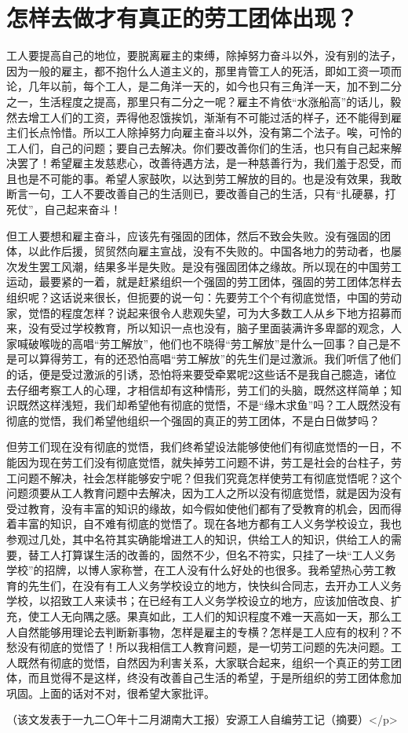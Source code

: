 \section{怎样去做才有真正的劳工团体出现？ }


工人要提高自己的地位，要脱离雇主的束缚，除掉努力奋斗以外，没有别的法子，因为一般的雇主，都不抱什么人道主义的，那里肯管工人的死活，即如工资一项而论，几年以前，每个工人，是二角洋一天的，如今也只有三角洋一天，加不到二分之一，生活程度之提高，那里只有二分之一呢？雇主不肯依“水涨船高”的话儿，毅然去增工人们的工资，弄得他忍饿挨饥，渐渐有不可能过活的样子，还不能得到雇主们长点怜惜。所以工人除掉努力向雇主奋斗以外，没有第二个法子。唉，可怜的工人们，自己的问题；要自己去解决。你们要改善你们的生活，也只有自己起来解决罢了！希望雇主发慈悲心，改善待遇方法，是一种慈善行为，我们羞于忍受，而且也是不可能的事。希望人家鼓吹，以达到劳工解放的目的。也是没有效果，我敢断言一句，工人不要改善自己的生活则已，要改善自己的生活，只有“扎硬暴，打死仗”，自己起来奋斗！

但工人要想和雇主奋斗，应该先有强固的团体，然后不致会失败。没有强固的团体，以此作后援，贸贸然向雇主宣战，没有不失败的。中国各地力的劳动者，也屡次发生罢工风潮，结果多半是失败。是没有强固团体之缘故。所以现在的中国劳工运动，最要紧的一着，就是赶紧组织一个强固的劳工团体，强固的劳工团体怎样去组织呢？这话说来很长，但扼要的说一句：先要劳工个个有彻底觉悟，中国的劳动家，觉悟的程度怎样？说起来很令人悲观失望，可为大多数工人从乡下地方招募而来，没有受过学校教育，所以知识一点也没有，脑子里面装满许多卑鄙的观念，人家喊破喉咙的高唱“劳工解放”，他们也不晓得“劳工解放”是什么一回事？自己是不是可以算得劳工，有的还恐怕高唱“劳工解放”的先生们是过激派。我们听信了他们的话，便是受过激派的引诱，恐怕将来要受牵累呢2这些话不是我自己臆造，诸位去仔细考察工人的心理，才相信却有这种情形，劳工们的头脑，既然这样简单；知识既然这样浅短，我们却希望他有彻底的觉悟，不是“缘木求鱼”吗？工人既然没有彻底的觉悟，我们希望他组织一个强固的真正的劳工团体，不是白日做梦吗？

但劳工们现在没有彻底的觉悟，我们终希望设法能够使他们有彻底觉悟的一日，不能因为现在劳工们没有彻底觉悟，就失掉劳工问题不讲，劳工是社会的台柱子，劳工问题不解决，社会怎样能够安宁呢？但我们究竟怎样使劳工有彻底觉悟呢？这个问题须要从工人教育问题中去解决，因为工人之所以没有彻底觉悟，就是因为没有受过教育，没有丰富的知识的缘故，如今假如使他们都有了受教育的机会，因而得着丰富的知识，自不难有彻底的觉悟了。现在各地方都有工人义务学校设立，我也参观过几处，其中名符其实确能增进工人的知识，供给工人的知识，供给工人的需要，替工人打算谋生活的改善的，固然不少，但名不符实，只挂了一块“工人义务学校”的招牌，以博人家称誉，在工人没有什么好处的也很多。我希望热心劳工教育的先生们，在没有有工人义务学校设立的地方，快快纠合同志，去开办工人义务学校，以招致工人来读书；在已经有工人义务学校设立的地方，应该加倍改良、扩充，使工人无向隅之感。果真如此，工人们的知识程度不难一天高如一天，那么工人自然能够用理论去判断新事物，怎样是雇主的专横？怎样是工人应有的权利？不愁没有彻底的觉悟了！所以我相信工人教育问题，是一切劳工问题的先决问题。工人既然有彻底的觉悟，自然因为利害关系，大家联合起来，组织一个真正的劳工团体，而且觉得不是这样，终没有改善自己生活的希望，于是所组织的劳工团体愈加巩固。上面的话对不对，很希望大家批评。

\begin{flushright}（该文发表于一九二〇年十二月湖南大工报）安源工人自编劳工记（摘要）</p>\end{flushright}

